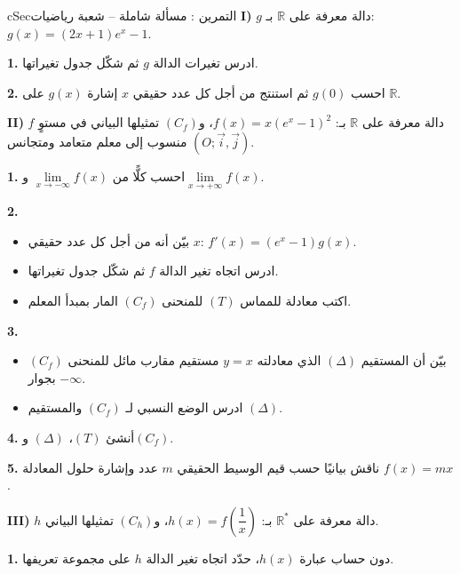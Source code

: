 \documentclass[12pt,a4paper]{article}
\newenvironment{BOX}[2]{\begin{otherlanguage}{english}\begin{arbox}{#1}{#2}}{\end{arbox}\end{otherlanguage}}
\newcounter{exo}
\newenvironment{tamrin}[1]{\stepcounter{exo}\begin{BOX}{cSec}{التمرين \theexo: #1}}{\end{BOX}}
\newcommand{\R}{\mathbb{R}}
\newenvironment{sq}{\begin{itemize}[leftmargin=2.4em,itemsep=3pt]}{\end{itemize}}
\newcommand{\qa}{\item[(أ)]}\newcommand{\qb}{\item[(ب)]}\newcommand{\qc}{\item[(جـ)]}\newcommand{\qd}{\item[(د)]}\newcommand{\qe}{\item[(هـ)]}
\newcommand{\QQ}[1]{\par\smallskip\textbf{#1.} }
\begin{document}
\begin{tamrin}{مسألة شاملة -- شعبة رياضيات}
\textbf{I)} $g$ دالة معرفة على $\R$ بـ: $g(x)=(2x+1)e^{x}-1$.
\QQ{1} ادرس تغيرات الدالة $g$ ثم شكّل جدول تغيراتها.
\QQ{2} احسب $g(0)$ ثم استنتج من أجل كل عدد حقيقي $x$ إشارة $g(x)$ على $\R$.

\textbf{II)} $f$ دالة معرفة على $\R$ بـ: $f(x)=x\left(e^{x}-1\right)^2$، و$(C_f)$ تمثيلها البياني في مستوٍ منسوب إلى معلم متعامد ومتجانس $(O;\vec i,\vec j)$.
\QQ{1} احسب كلًّا من $\lim\limits_{x\to-\infty}f(x)$ و$\lim\limits_{x\to+\infty}f(x)$.
\QQ{2}
\begin{sq}
\qa بيّن أنه من أجل كل عدد حقيقي $x$: $f'(x)=\left(e^{x}-1\right)g(x)$.
\qb ادرس اتجاه تغير الدالة $f$ ثم شكّل جدول تغيراتها.
\qc اكتب معادلة للمماس $(T)$ للمنحنى $(C_f)$ المار بمبدأ المعلم.
\end{sq}
\QQ{3}
\begin{sq}
\qa بيّن أن المستقيم $(\Delta)$ الذي معادلته $y=x$ مستقيم مقارب مائل للمنحنى $(C_f)$ بجوار $-\infty$.
\qb ادرس الوضع النسبي لـ $(C_f)$ والمستقيم $(\Delta)$.
\end{sq}
\QQ{4} أنشئ $(T)$، $(\Delta)$ و$(C_f)$.
\QQ{5} ناقش بيانيًا حسب قيم الوسيط الحقيقي $m$ عدد وإشارة حلول المعادلة $f(x)=mx$.

\textbf{III)} $h$ دالة معرفة على $\R^{*}$ بـ: $h(x)=f\left(\dfrac1x\right)$، و$(C_h)$ تمثيلها البياني.
\QQ{1} دون حساب عبارة $h(x)$، حدّد اتجاه تغير الدالة $h$ على مجموعة تعريفها.
\end{tamrin}
\end{document}
